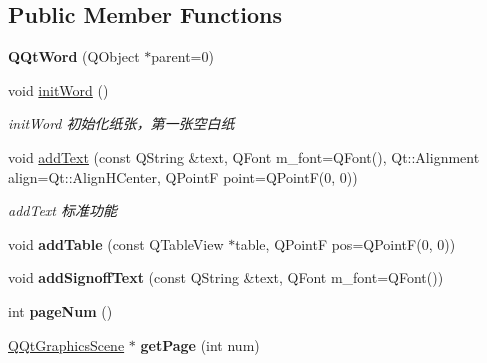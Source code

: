 \subsection*{Public Member Functions}
\begin{DoxyCompactItemize}
\item 
\mbox{\label{class_q_qt_word_a18039e5a412cb17fbd23137df5c8a724}} 
{\bfseries Q\+Qt\+Word} (Q\+Object $\ast$parent=0)
\item 
\mbox{\label{class_q_qt_word_a09e1f556f5d7dbb6dd2e242a2961ae2c}} 
void \mbox{\hyperlink{class_q_qt_word_a09e1f556f5d7dbb6dd2e242a2961ae2c}{init\+Word}} ()
\begin{DoxyCompactList}\small\item\em init\+Word 初始化纸张，第一张空白纸 \end{DoxyCompactList}\item 
\mbox{\label{class_q_qt_word_a9410fd6a9a0bffbd6e9151266cabce05}} 
void \mbox{\hyperlink{class_q_qt_word_a9410fd6a9a0bffbd6e9151266cabce05}{add\+Text}} (const Q\+String \&text, Q\+Font m\+\_\+font=Q\+Font(), Qt\+::\+Alignment align=Qt\+::\+Align\+H\+Center, Q\+PointF point=Q\+PointF(0, 0))
\begin{DoxyCompactList}\small\item\em add\+Text 标准功能 \end{DoxyCompactList}\item 
\mbox{\label{class_q_qt_word_ac37d7691b8893d1223be096593bd6833}} 
void {\bfseries add\+Table} (const Q\+Table\+View $\ast$table, Q\+PointF pos=Q\+PointF(0, 0))
\item 
\mbox{\label{class_q_qt_word_a13a0a946124c71624fa772187d62b70b}} 
void {\bfseries add\+Signoff\+Text} (const Q\+String \&text, Q\+Font m\+\_\+font=Q\+Font())
\item 
\mbox{\label{class_q_qt_word_a7d93336c310628078eec0bf838688c89}} 
int {\bfseries page\+Num} ()
\item 
\mbox{\label{class_q_qt_word_a20b8959a7cebdef9b2d1de77ebb6ef5e}} 
\mbox{\hyperlink{class_q_qt_graphics_scene}{Q\+Qt\+Graphics\+Scene}} $\ast$ {\bfseries get\+Page} (int num)
\item 

\end{DoxyCompactItemize}
